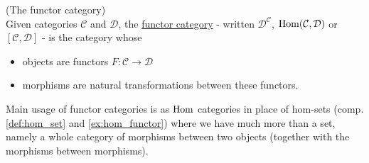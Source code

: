 \begin{definition}{(The functor category)}\label{def:functor_category}\\
Given categories $\mathcal{C}$ and $\mathcal{D}$, the \ul{functor category} - written $\mathcal{D}^{\mathcal{C}}$, $\textup{Hom}(\mathcal{C},
\mathcal{D})$ or $[\mathcal{C}, \mathcal{D}]$ -
is the category whose
\begin{itemize}
\item objects are functors $F : \mathcal{C} \rightarrow \mathcal{D}$
\item morphisms are natural transformations between these functors.
\end{itemize}
Main usage of functor categories is as $\textup{Hom}$ categories in place of hom-sets (comp. \ref{def:hom_set} and \ref{ex:hom_functor}) where
we have much more than a set, namely a whole category of morphisms between two objects (together with the morphisms between morphisms).
\end{definition}
